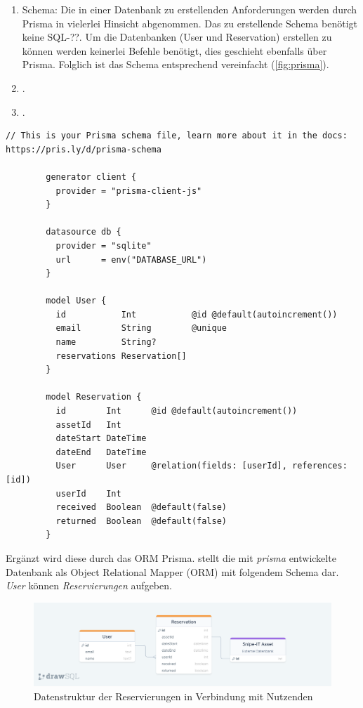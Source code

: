 \begin{enumerate}[1]
  \item Schema: Die in einer Datenbank zu erstellenden Anforderungen werden
        durch Prisma in vielerlei Hinsicht abgenommen. Das zu erstellende Schema
        benötigt keine SQL-??. Um die Datenbanken (User und Reservation) erstellen zu
        können werden keinerlei Befehle benötigt, dies geschieht ebenfalls über
        Prisma. Folglich ist das Schema entsprechend vereinfacht (\ref{fig:prisma}).
  \item .
  \item .
\end{enumerate}

\begin{lstlisting}[style=pseudo,gobble=2,caption={Pseudocode: Kategorien anzeigen},label=fig:prisma]
    // This is your Prisma schema file, learn more about it in the docs: https://pris.ly/d/prisma-schema

        generator client {
          provider = "prisma-client-js"
        }

        datasource db {
          provider = "sqlite"
          url      = env("DATABASE_URL")
        }

        model User {
          id           Int           @id @default(autoincrement())
          email        String        @unique
          name         String?
          reservations Reservation[]
        }

        model Reservation {
          id        Int      @id @default(autoincrement())
          assetId   Int
          dateStart DateTime
          dateEnd   DateTime
          User      User     @relation(fields: [userId], references: [id])
          userId    Int
          received  Boolean  @default(false)
          returned  Boolean  @default(false)
        }
\end{lstlisting}


Ergänzt wird diese durch das ORM Prisma.
stellt die mit \textit{prisma} entwickelte Datenbank als Object Relational
Mapper (ORM) mit folgendem Schema dar. \textit{User} können
\textit{Reservierungen} aufgeben.

\begin{figure}[h]
  \centering
  \includegraphics[scale=0.2]{Bilder/drawSQL-export-2022-10-09_15 56.png}
  \caption[Datenstruktur der Reservierungen in Verbindung mit Nutzenden]{Datenstruktur der Reservierungen in Verbindung mit Nutzenden}
  \label{fig:orm}
\end{figure}


